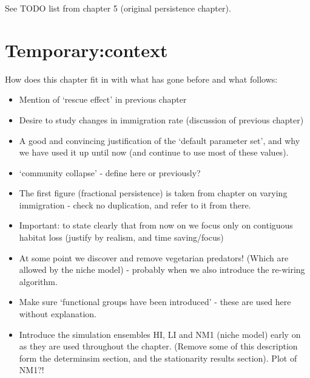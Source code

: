 
See TODO list from chapter 5 (original persistence chapter).
%
%


\section{Temporary:context}

How does this chapter fit in with what has gone before and what follows:
\begin{itemize}
	\item Mention of `rescue effect' in previous chapter
	\item Desire to study changes in immigration rate (discussion of previous chapter)
	\item A good and convincing justification of the `default parameter set', and why we have used it up until now (and continue to use most of these values). 
	\item `community collapse' - define here or previously?
	
	\item The first figure (fractional persistence) is taken from chapter on varying immigration - check no duplication, and refer to it from there.
	
	\item Important: to state clearly that from now on we focus only on contiguous habitat loss (justify by realism, and time saving/focus)

	\item At some point we discover and remove vegetarian predators! (Which are allowed by the niche model) - probably when we also introduce the re-wiring algorithm.
	
	\item Make sure `functional groups have been introduced' - these are used here without explanation.
	
	\item Introduce the simulation ensembles HI, LI and NM1 (niche model) early on as they are used throughout the chapter. (Remove some of this description form the determinsim section, and the stationarity results section). Plot of NM1?!
\end{itemize}

